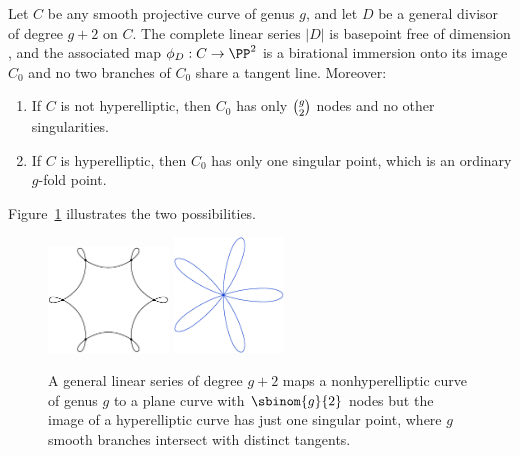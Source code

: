 \begin{theorem}\label{needed for nodes}
Let $C$ be any smooth projective curve of genus $g$, and let $D$ be a
general divisor of degree $g+2$ on $C$.
The complete linear series $|D|$ is basepoint free of dimension \2,
and the associated map $\phi_D: C\to \PP^2$
 is a
birational
immersion
%
onto its image $C_0$
and no two branches of $C_0$ share a tangent line.
Moreover:

\begin{enumerate}
\item If $C$ is not hyperelliptic, then $C_0$ has only $\tbinom{g}{2}$
nodes and no other singularities.
\item If $C$ is hyperelliptic,
then
$C_0$ has only one singular point,
  which is an ordinary $g$-fold point.
\end{enumerate}
\end{theorem}

Figure~\ref{Fig9.4} illustrates the two possibilities.

\begin{figure}
\leavevmode{}\hbox{\includegraphics[height=1.1in]{main/Fig09-4A}}
\qquad
\includegraphics[height=1.2in]{main/five}
\caption{A general linear series of degree $g+2$ maps a nonhyperelliptic
curve of genus $g$
to a plane curve with $\protect\sbinom{g}{2}$ nodes
but the image of a
hyperelliptic curve has
just one singular point, where $g$ smooth branches intersect with
distinct tangents.
}
\label{Fig9.4}
\end{figure}

